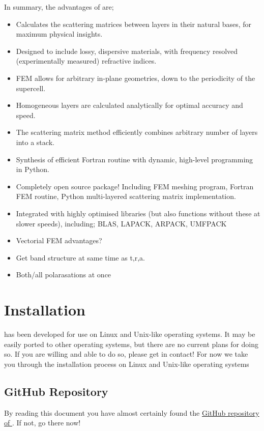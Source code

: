 \documentclass[11pt,a4paper,twoside]{report}
\begin{document}
In summary, the advantages of \CodeName are;
\begin{itemize}
    \item Calculates the scattering matrices between layers in their natural bases, for maximum physical insights.
    \item Designed to include lossy, dispersive materials, with frequency resolved (experimentally measured) refractive indices.
    \item FEM allows for arbitrary in-plane geometries, down to the periodicity of the supercell.
    \item Homogeneous layers are calculated analytically for optimal accuracy and speed.
    \item The scattering matrix method efficiently combines arbitrary number of layers into a stack.
    \item Synthesis of efficient Fortran routine with dynamic, high-level programming in Python.
    \item Completely open source package! Including FEM meshing program, Fortran FEM routine, Python multi-layered scattering matrix implementation. 
    \item Integrated with highly optimised libraries (but also functions without these at slower speeds), including; BLAS, LAPACK, ARPACK, UMFPACK
    \item Vectorial FEM advantages?
    \item Get band structure at same time as t,r,a.
    \item Both/all polarasations at once
\end{itemize}



\chapter{Installation}
\label{Install}

\CodeName has been developed for use on Linux and Unix-like operating systems. It may be easily ported to other operating systems, but there are no current plans for doing so. If you are willing and able to do so, please get in contact!
For now we take you through the installation process on Linux and Unix-like operating systems



\section{GitHub Repository}
By reading this document you have almost certainly found the \href{https://github.com}{GitHub repository of \CodeName}. If not, go there now!
\end{document}
